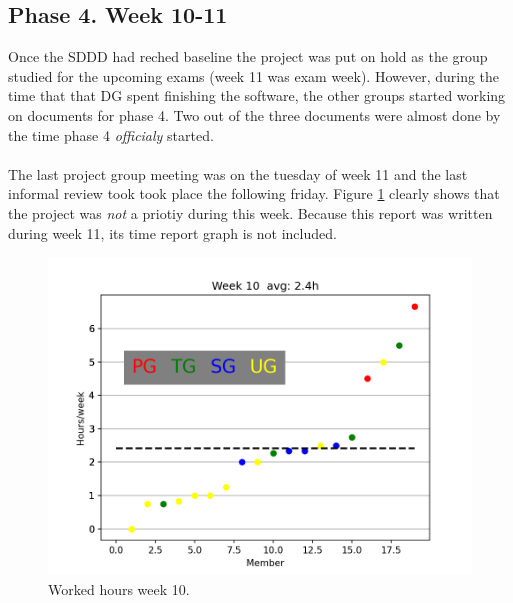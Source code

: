 \documentclass{article}
\begin{document}
    \subsection{Phase 4. Week 10-11 \label{phase4}}
        Once the SDDD had reched baseline the project was put on hold as the group
        studied for the upcoming exams (week 11 was exam week). However, during the time that
        that DG spent finishing the software, the other groups started working on documents for phase 4.
        Two out of the three documents were almost done by the time phase 4 \emph{officialy} started.
        \\ \\
        The last project group meeting was on the tuesday of week 11 and the last informal review took
        took place the following friday. Figure \ref{fig:week10} clearly shows that the project was \emph{not}
        a priotiy during this week. Because this report was written during week 11, its time report graph is not included.
        \begin{figure}[!htb]
            \centering
              \includegraphics[width=\linewidth]{images/week_10.png}
              \caption{Worked hours week 10.}\label{fig:week10}
            \endminipage\hfill
        \end{figure}
\end{document}
